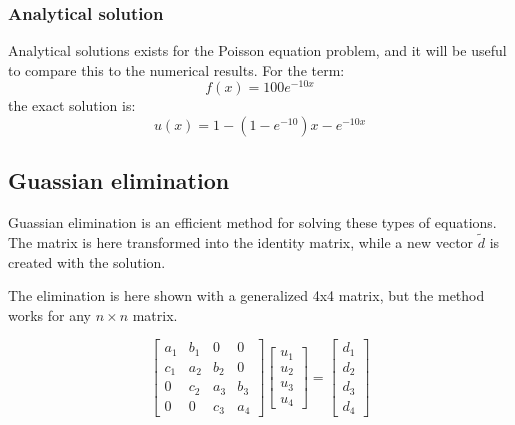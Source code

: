 \documentclass[12pt]{article}
\begin{document}
\subsubsection{Analytical solution}
Analytical solutions exists for the Poisson equation problem, and it will be useful to compare this to the numerical results. 
For the term:
\begin{equation}
f(x) = 100e^{-10x}
\end{equation}
the exact solution is:
\begin{equation}
u(x) = 1-(1-e^{-10})x-e^{-10x}
\end{equation}

\subsection{Guassian elimination}
Guassian elimination is an efficient method for solving these types of equations. The matrix is here transformed into the identity matrix, while a new vector $\tilde{d}$ is created with the solution. 

The elimination is here shown with a generalized 4x4 matrix, but the method works for any $n\times n$ matrix. 

\begin{equation}
\begin{bmatrix}
                           a_{1}&b_{1}&0&0 \\
                           c_{1}&a_{2}&b_{2}&0\\
                           0&c_{2}&a_{3}&b_{3}\\
                           0&0&c_{3}&a_{4}
                      \end{bmatrix}
                      \begin{bmatrix}
                           u_{1} \\
                           u_{2}\\
                           u_{3}\\
                           u_{4}
                      \end{bmatrix}
                      =
                      \begin{bmatrix}
                           d_{1} \\
                           d_{2}\\
                           d_{3}\\
                           d_{4}
                      \end{bmatrix}
\end{equation}
\end{document}
